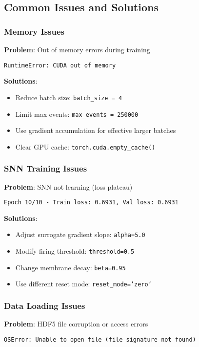 \documentclass[12pt,a4paper]{article}
\begin{document}
\subsection{Common Issues and Solutions}

\subsubsection{Memory Issues}

\textbf{Problem}: Out of memory errors during training
\begin{lstlisting}
RuntimeError: CUDA out of memory
\end{lstlisting}

\textbf{Solutions}:
\begin{itemize}
    \item Reduce batch size: \texttt{batch\_size = 4}
    \item Limit max events: \texttt{max\_events = 250000}
    \item Use gradient accumulation for effective larger batches
    \item Clear GPU cache: \texttt{torch.cuda.empty\_cache()}
\end{itemize}

\subsubsection{SNN Training Issues}

\textbf{Problem}: SNN not learning (loss plateau)
\begin{lstlisting}
Epoch 10/10 - Train loss: 0.6931, Val loss: 0.6931
\end{lstlisting}

\textbf{Solutions}:
\begin{itemize}
    \item Adjust surrogate gradient slope: \texttt{alpha=5.0}
    \item Modify firing threshold: \texttt{threshold=0.5}
    \item Change membrane decay: \texttt{beta=0.95}
    \item Use different reset mode: \texttt{reset\_mode='zero'}
\end{itemize}

\subsubsection{Data Loading Issues}

\textbf{Problem}: HDF5 file corruption or access errors
\begin{lstlisting}
OSError: Unable to open file (file signature not found)
\end{lstlisting}
\end{document}
